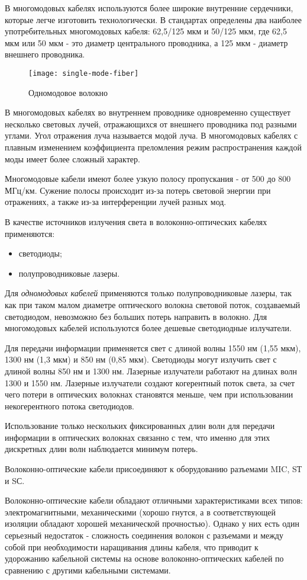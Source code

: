 В   многомодовых кабелях используются более широкие внутренние сердечники, которые легче изготовить технологически.
В стандартах определены два наиболее употребительных многомодовых кабеля: 62,5/125 мкм и 50/125 мкм, где 62,5 мкм или 50 мкм - это диаметр центрального проводника, а 125 мкм - диаметр внешнего проводника.

\begin{figure}
    \centering
    \texttt{[image: single-mode-fiber]}
    \caption{Одномодовое волокно}
    \label{fig:single-mode-fiber}
\end{figure}

В многомодовых кабелях во внутреннем проводнике одновременно существует несколько световых лучей, отражающихся от внешнего проводника под разными углами.
Угол отражения луча называется модой луча.
В многомодовых кабелях с плавным изменением коэффициента преломления режим распространения каждой моды имеет более сложный характер.

Многомодовые кабели имеют более узкую полосу пропускания - от 500 до 800 МГц/км.
Сужение полосы происходит из-за потерь световой энергии при отражениях, а также из-за интерференции лучей разных мод.

В качестве источников излучения света в волоконно-оптических кабелях применяются:
\begin{itemize}
    \item светодиоды;
    \item полупроводниковые лазеры.
\end{itemize}

Для \emph{одномодовых кабелей} применяются только полупроводниковые лазеры, так как при таком малом диаметре оптического волокна световой поток, создаваемый светодиодом, невозможно без больших потерь направить в волокно.
Для многомодовых кабелей используются более дешевые светодиодные излучатели.

Для передачи информации применяется свет с длиной волны 1550 нм (1,55 мкм), 1300 нм (1,3 мкм) и 850 нм (0,85 мкм).
Светодиоды могут излучить свет с длиной волны 850 нм и 1300 нм.
Лазерные излучатели работают на длинах волн 1300 и 1550 нм.
Лазерные излучатели создают когерентный поток света, за счет чего потери в оптических волокнах становятся меньше, чем при использовании некогерентного потока светодиодов.

Использование только нескольких фиксированных длин волн для передачи информации в оптических волокнах связанно с тем, что именно для этих дискретных длин волн наблюдается минимум потерь.

Волоконно-оптические кабели присоединяют к оборудованию разъемами MIC, SТ и SС.

Волоконно-оптические кабели обладают отличными характеристиками всех типов: электромагнитными, механическими (хорошо гнутся, а в соответствующей изоляции обладают хорошей механической прочностью).
Однако у них есть один серьезный недостаток - сложность соединения волокон с разъемами и между собой при необходимости наращивания длины кабеля, что приводит к удорожанию кабельной системы на основе волоконно-оптических кабелей по сравнению с другими кабельными системами.
